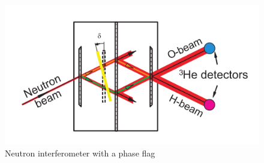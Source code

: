 \begin{figure}[ht!]
\centering
\includegraphics[scale=0.7]{Figures/phase_flag.png}
\caption{Neutron interferometer with a phase flag \cite{dimaThesis} }
\label{fig:phaseflag}
\end{figure}

